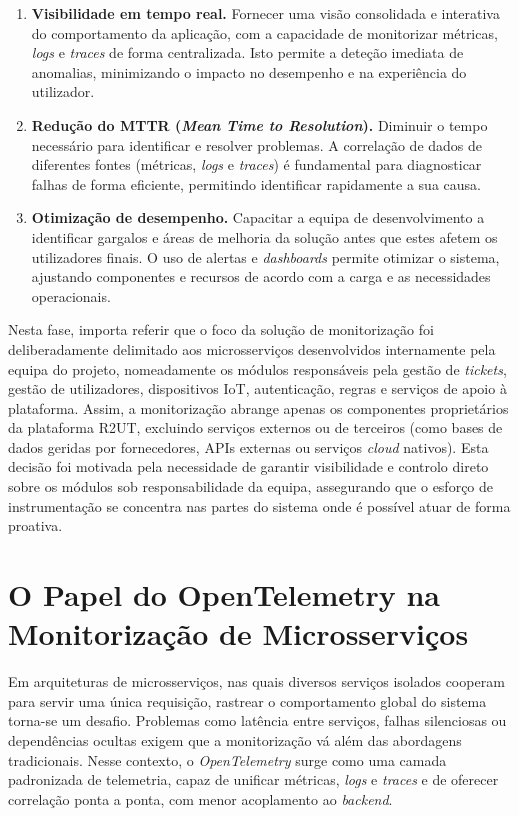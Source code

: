 \begin{enumerate}
    \item \textbf{Visibilidade em tempo real.} Fornecer uma visão consolidada e interativa do comportamento da aplicação, com a capacidade de monitorizar métricas, \textit{logs} e \textit{traces} de forma centralizada. Isto permite a deteção imediata de anomalias, minimizando o impacto no desempenho e na experiência do utilizador.

    \item \textbf{Redução do MTTR (\textit{Mean Time to Resolution}).} Diminuir o tempo necessário para identificar e resolver problemas. A correlação de dados de diferentes fontes (métricas, \textit{logs} e \textit{traces}) é fundamental para diagnosticar falhas de forma eficiente, permitindo identificar rapidamente a sua causa.

    \item \textbf{Otimização de desempenho.} Capacitar a equipa de desenvolvimento a identificar gargalos e áreas de melhoria da solução antes que estes afetem os utilizadores finais. O uso de alertas e \textit{dashboards} permite otimizar o sistema, ajustando componentes e recursos de acordo com a carga e as necessidades operacionais.
\end{enumerate}

Nesta fase, importa referir que o foco da solução de monitorização foi deliberadamente delimitado aos microsserviços desenvolvidos internamente pela equipa do projeto, nomeadamente os módulos responsáveis pela gestão de \textit{tickets}, gestão de utilizadores, dispositivos IoT, autenticação, regras e serviços de apoio à plataforma. Assim, a monitorização abrange apenas os componentes proprietários da plataforma R2UT, excluindo serviços externos ou de terceiros (como bases de dados geridas por fornecedores, APIs externas ou serviços \textit{cloud} nativos). Esta decisão foi motivada pela necessidade de garantir visibilidade e controlo direto sobre os módulos sob responsabilidade da equipa, assegurando que o esforço de instrumentação se concentra nas partes do sistema onde é possível atuar de forma proativa.


\section{O Papel do OpenTelemetry na Monitorização de Microsserviços}

Em arquiteturas de microsserviços, nas quais diversos serviços isolados cooperam para servir uma única requisição, rastrear o comportamento global do sistema torna-se um desafio. Problemas como latência entre serviços, falhas silenciosas ou dependências ocultas exigem que a monitorização vá além das abordagens tradicionais. Nesse contexto, o \textit{OpenTelemetry} surge como uma camada padronizada de telemetria, capaz de unificar métricas, \textit{logs} e \textit{traces} e de oferecer correlação ponta a ponta, com menor acoplamento ao \textit{backend}.

